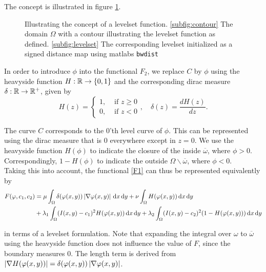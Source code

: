 The concept is illustrated in figure \ref{fig:levelsetconcept}.

\begin{figure}
  \centering
  \quad
  \caption{Illustrating the concept of a levelset function. \ref{subfig:contour} The domain $\Omega$ with a contour illustrating the levelset function as defined. \ref{subfig:levelset} The corresponding levelset initialized as a signed distance map using matlabs \texttt{bwdist}}\label{fig:levelsetconcept}
\end{figure}

In order to introduce $\phi$ into the functional $F_2$, we replace $C$ by $\phi$ using the heavyside function $H:\mathbb R \to \{0,1\}$ and the corresponding dirac measure $\delta:\mathbb R\to \mathbb R^+$, given by
\begin{equation}
  H(z) = \begin{cases}
    1,& \mbox{ if }  z \geq 0\\
    0,& \mbox{ if }  z < 0
  \end{cases}, \quad 
  \delta(z) = \frac{dH(z)}{dz}.
\end{equation}


The curve $C$ corresponds to the 0'th level curve of $\phi$. This can be represented using the dirac measure that is 0 everywhere except in $z=0$. We use the heavyside function $H(\phi)$ to indicate the closure of the inside $\overline{\omega}$, where $\phi > 0$. Correspondingly, $1-H(\phi)$ to indicate the outside $\Omega\backslash \overline{\omega}$, where $\phi < 0$.\\
Taking this into account, the functional \eqref{F1} can thus be represented equivalently by
\begin{align}
\begin{split}
  F(\phi,c_1,c_2) &= \mu \int_\Omega \delta(\phi(x,y))\abs{\nabla\phi(x,y)} \df x \df y + \nu \int_{\Omega} H(\phi(x,y)) \df x \df y\\
  &+ \lambda_1\int_{\Omega}(I(x,y)-c_1)^2H(\phi(x,y)) \df x \df y + \lambda_2\int_{\Omega} (I(x,y)-c_2)^2 (1-H(\phi(x,y)))\df x \df y\label{F2}
\end{split}
\end{align}

in terms of a levelset formulation. Note that expanding the integral over $\omega$ to $\overline{\omega}$ using the heavyside function does not influence the value of $F$, since the boundary measures 0. The length term is derived from $\left| {\nabla H(\varphi(x,y))} \right| = \delta(\varphi(x,y))\left| {\nabla \varphi(x,y)} \right|$.

